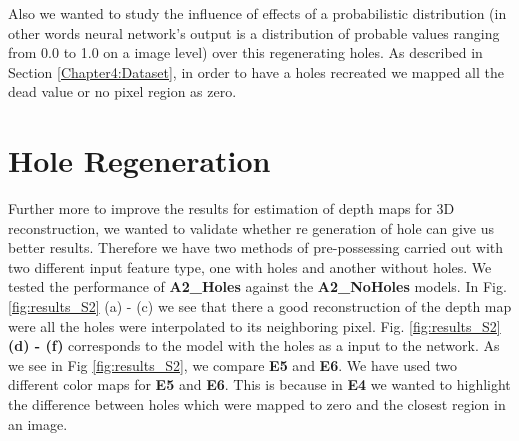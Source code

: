  Also we wanted to study the influence of effects of a probabilistic distribution (in other words neural network's output is a distribution of probable values ranging from 0.0 to 1.0 on a image level) over this regenerating holes. As described in Section \ref{Chapter4:Dataset}, in order to have a holes recreated we mapped all the dead value or no pixel region as zero.


 \section{Hole Regeneration}
 \label{Chapter6:Hole_Regeneration}


Further more to improve the results for estimation of depth maps for 3D reconstruction, we wanted to validate whether re generation of hole can give us better results. Therefore we have two methods of pre-possessing carried out with two different input feature type, one with holes and another without holes. We tested the performance of \textbf{A2\_Holes} against the \textbf{A2\_NoHoles} models. In Fig. \ref{fig:results_S2} (a) - (c) we see that there a good reconstruction of the depth map were all the holes were interpolated to its neighboring pixel.  Fig. \ref{fig:results_S2} \textbf{(d) - (f)}  corresponds to the model with the holes as a input to the network. As we see in Fig \ref{fig:results_S2}, we compare \textbf{E5} and \textbf{E6}. We have used two different color maps for \textbf{E5} and \textbf{E6}. This is because in \textbf{E4} we wanted to highlight the difference between holes which were mapped to zero and the closest region in an image. 


